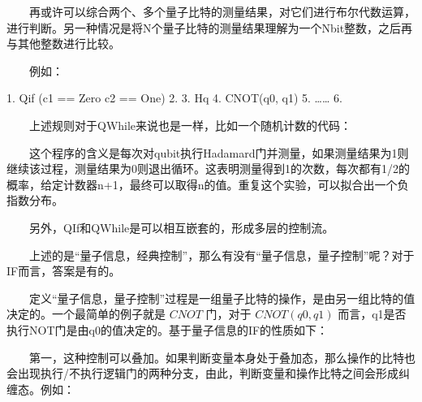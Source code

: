 \documentclass[a4paper,11pt,english]{sphinxmanual}
\begin{document}
\sphinxAtStartPar
  再或许可以综合两个、多个量子比特的测量结果，对它们进行布尔代数运算，进行判断。另一种情况是将N个量子比特的测量结果理解为一个N\sphinxhyphen{}bit整数，之后再与其他整数进行比较。

\sphinxAtStartPar
  例如：

\begin{sphinxVerbatim}[commandchars=\\\{\}]
1.  Qif (c1 == Zero \PYGZam{}\PYGZam{} c2 == One)
2.  \PYGZob{}
3.          H\PYGZhy{}\PYGZgt{}q
4.          CNOT(q0, q1)
5.          ……
6.  \PYGZcb{}
\end{sphinxVerbatim}

\sphinxAtStartPar
  上述规则对于QWhile来说也是一样，比如一个随机计数的代码：

\begin{sphinxVerbatim}[commandchars=\\\{\}]
    
    
  
  
            
           
       
  
\end{sphinxVerbatim}

\sphinxAtStartPar
  这个程序的含义是每次对qubit执行Hadamard门并测量，如果测量结果为1则继续该过程，测量结果为0则退出循环。这表明测量得到1的次数，每次都有1/2的概率，给定计数器n+1，最终可以取得n的值。重复这个实验，可以拟合出一个负指数分布。

\sphinxAtStartPar
  另外，QIf和QWhile是可以相互嵌套的，形成多层的控制流。

\sphinxAtStartPar
{}

\sphinxAtStartPar
  上述的是“量子信息，经典控制”，那么有没有“量子信息，量子控制”呢？对于IF而言，答案是有的。

\sphinxAtStartPar
  定义“量子信息，量子控制”过程是一组量子比特的操作，是由另一组比特的值决定的。一个最简单的例子就是 \(CNOT\) 门，对于 \(CNOT(q0,q1)\) 而言，q1是否执行NOT门是由q0的值决定的。基于量子信息的IF的性质如下：

\sphinxAtStartPar
  第一，这种控制可以叠加。如果判断变量本身处于叠加态，那么操作的比特也会出现执行/不执行逻辑门的两种分支，由此，判断变量和操作比特之间会形成纠缠态。例如：
\end{document}
